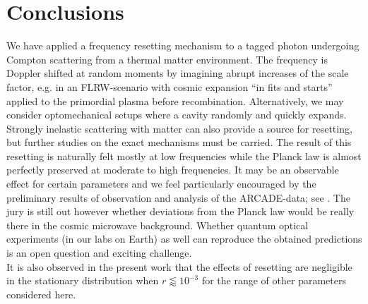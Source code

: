 \documentclass[a4paper,12pt,reqno,superscriptaddress,nofootinbib]{revtex4}
\theoremstyle{plain}
\theoremstyle{definition}
\theoremstyle{remark}
\newcommand{\0}{^{(0)}}
\newcommand{\1}{^{(1)}}
\newcommand{\2}{^{(2)}}
\begin{document}
\section {Conclusions}\label{con}
We have applied a frequency resetting mechanism to a tagged photon undergoing Compton scattering from a thermal matter environment.  The frequency is Doppler shifted at random moments by imagining abrupt increases of the scale factor, e.g. in an FLRW-scenario with cosmic expansion ``in fits and starts'' applied to the primordial plasma before recombination. Alternatively, we may consider optomechanical setups where a cavity  randomly and  quickly expands. Strongly inelastic scattering with matter can also provide a source for resetting, but further studies on the exact mechanisms must be carried. The result of this resetting is naturally felt mostly at low frequencies while the Planck law is almost perfectly preserved at moderate to high frequencies.  It may be an observable effect for certain parameters and we feel particularly encouraged by the preliminary results of observation and analysis of the ARCADE-data; see \cite{arca,arcade1,arcade2,edges}.  The jury is still out however whether deviations from the Planck law would be really there in the cosmic microwave background.  Whether quantum optical experiments (in our labs on Earth) as well can reproduce the obtained predictions is an open question and exciting challenge.\\
It is also observed in the present work that the effects of resetting are negligible in the stationary distribution when $r\lessapprox 10^{-3}$ for the range of other parameters considered here.\\

%

\end{document}
